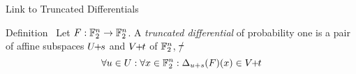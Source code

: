 \begin{frame}{Link to Truncated Differentials}
    \begin{block}{Definition~\cite{FSE:Knudsen94,FSE:BloLeaNyb14}}
        Let $F : \mathbb{F}_2^n \to \mathbb{F}_2^n$.
        A \emph{truncated differential} of probability one is a pair of affine subspaces $U \!\! + \!\! s$ and $V \!\! + \!\! t$ of $\mathbb{F}_2^n$, \st/
        \begin{equation*}
            \forall u \in U : \forall x \in \mathbb{F}_2^n : \Delta_{u + s}(F)(x) \in V \!\! + \!\! t
        \end{equation*}
    \end{block}
\end{frame}

